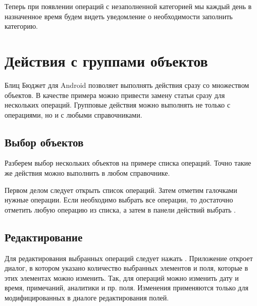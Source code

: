 \documentclass[a4paper,10pt,russian]{sphinxmanual}
\begin{document}
\sphinxAtStartPar
Теперь при появлении операций с незаполненной категорией мы каждый день в назначенное время
будем видеть уведомление о необходимости заполнить категорию.

\sphinxstepscope


\chapter{Действия с группами объектов}
\label{\detokenize{bulk-actions:chapter-bulk-actions}}\label{\detokenize{bulk-actions:id1}}\label{\detokenize{bulk-actions::doc}}
\sphinxAtStartPar
Блиц Бюджет для Android позволяет выполнять действия сразу со множеством объектов. В качестве примера можно привести замену
статьи сразу для нескольких операций. Групповые действия можно выполнять не только с операциями, но и с
любыми справочниками.


\section{Выбор объектов}
\label{\detokenize{bulk-actions:id2}}
\sphinxAtStartPar
Разберем выбор нескольких объектов на примере списка операций. Точно такие же действия можно выполнить в
любом справочнике.

\noindent{}

\noindent{}

\noindent{}

\sphinxAtStartPar
Первом делом следует открыть список операций. Затем отметим галочками нужные операции. Если необходимо выбрать все
операции, то достаточно отметить любую операцию из списка, а затем в панели действий выбрать .


\section{Редактирование}
\label{\detokenize{bulk-actions:id3}}
\sphinxAtStartPar
Для редактирования выбранных операций следует нажать . Приложение откроет диалог, в котором
указано количество выбранных элементов и поля, которые в этих элементах можно изменить. Так, для операций можно изменить
дату и время, примечаний, аналитики и пр. поля. Изменения применяются только для модифицированных в диалоге редактирования
полей.
\end{document}
